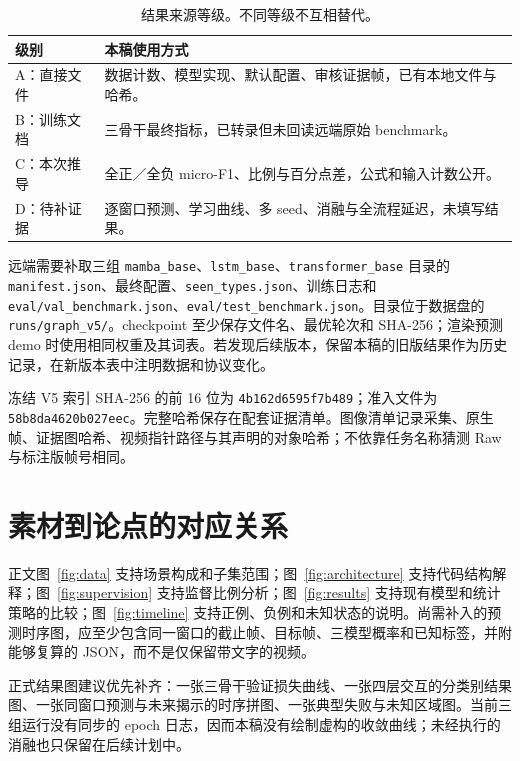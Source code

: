 \documentclass[10pt,twocolumn,letterpaper]{article}
\newcommand{\code}[1]{\texttt{\small #1}}
\begin{document}
\begin{table}[h]
\centering\small
\begin{tabularx}{\linewidth}{lX}
\toprule
级别 & 本稿使用方式\\
\midrule
A：直接文件 & 数据计数、模型实现、默认配置、审核证据帧，已有本地文件与哈希。\\
B：训练文档 & 三骨干最终指标，已转录但未回读远端原始 benchmark。\\
C：本次推导 & 全正／全负 micro-F1、比例与百分点差，公式和输入计数公开。\\
D：待补证据 & 逐窗口预测、学习曲线、多 seed、消融与全流程延迟，未填写结果。\\
\bottomrule
\end{tabularx}
\caption{结果来源等级。不同等级不互相替代。}
\end{table}

远端需要补取三组 \code{mamba\_base}、\code{lstm\_base}、\code{transformer\_base} 目录的 \code{manifest.json}、最终配置、\code{seen\_types.json}、训练日志和 \code{eval/val\_benchmark.json}、\code{eval/test\_benchmark.json}。目录位于数据盘的 \code{runs/graph\_v5/}。checkpoint 至少保存文件名、最优轮次和 SHA-256；渲染预测 demo 时使用相同权重及其词表。若发现后续版本，保留本稿的旧版结果作为历史记录，在新版本表中注明数据和协议变化。

冻结 V5 索引 SHA-256 的前 16 位为 \code{4b162d6595f7b489}；准入文件为 \code{58b8da4620b027eec}。完整哈希保存在配套证据清单。图像清单记录采集、原生帧、证据图哈希、视频指针路径与其声明的对象哈希；不依靠任务名称猜测 Raw 与标注版帧号相同。

\section{素材到论点的对应关系}
正文图~\ref{fig:data} 支持场景构成和子集范围；图~\ref{fig:architecture} 支持代码结构解释；图~\ref{fig:supervision} 支持监督比例分析；图~\ref{fig:results} 支持现有模型和统计策略的比较；图~\ref{fig:timeline} 支持正例、负例和未知状态的说明。尚需补入的预测时序图，应至少包含同一窗口的截止帧、目标帧、三模型概率和已知标签，并附能够复算的 JSON，而不是仅保留带文字的视频。

正式结果图建议优先补齐：一张三骨干验证损失曲线、一张四层交互的分类别结果图、一张同窗口预测与未来揭示的时序拼图、一张典型失败与未知区域图。当前三组运行没有同步的 epoch 日志，因而本稿没有绘制虚构的收敛曲线；未经执行的消融也只保留在后续计划中。
\end{document}
